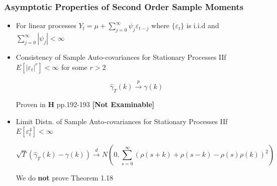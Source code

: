 \documentclass{beamer}
\begin{document}
		\begin{frame}
		\frametitle{Asymptotic Properties of Second Order Sample Moments }
		\begin{itemize}
	
		\item[] For linear processes $Y_t=\mu+\sum_{j=0}^{\infty} \psi_j \varepsilon_{t-j}$ where $\{\varepsilon_t\}$ is  i.i.d  and $\sum_{j=0}^{\infty} |\psi_j|<\infty$
	\pause
	\vspace{10pt}
	
	
	\item[] \begin{mytheo}{Consistency of Sample Auto-covariances for Stationary Processes}
		IIf $E[|\varepsilon_t|^r]<\infty$ for some $r>2$ 

	\begin{equation*}
\hat{\gamma}_T(k) \overset{p}{\rightarrow} \gamma(k) 
\end{equation*} 

\end{mytheo}

\pause
\vspace{2pt}
Proven in $\textbf{H}$ pp.192-193 \textbf{[Not Examinable]}

	\pause
\vspace{10pt}

	
		\item[] \begin{mytheo}{Limit Distn. of Sample Auto-covariances for Stationary Processes}
		IIf  $E[\varepsilon_t^4]<\infty$  
		
		\begin{equation*}
		\sqrt{T}(\hat{\gamma}_T(k)-\gamma(k)) \overset{d}{\rightarrow} N\left(0,\sum_{s=0}^{\infty} (\rho(s+k)+\rho(s-k)-\rho(s)\rho(k))^2\right) 
		\end{equation*} 
		
	\end{mytheo}

\pause
\vspace{2pt}
We do \textbf{not} prove Theorem 1.18
	
		\end{itemize}	\end{frame}
	
\end{document}
